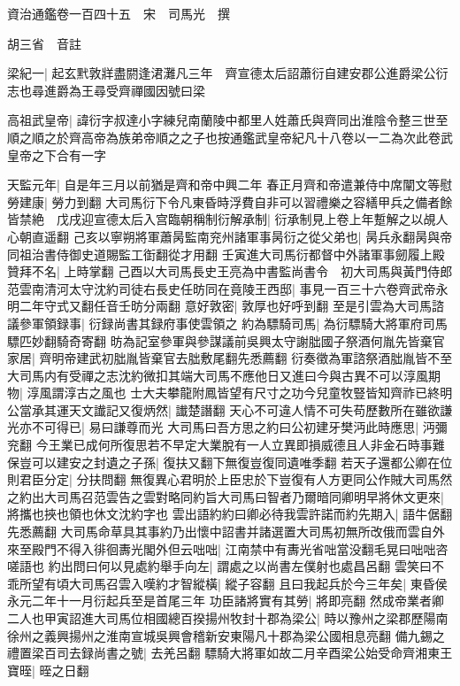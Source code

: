 資治通鑑卷一百四十五　宋　司馬光　撰

胡三省　音註

梁紀一|{
	起玄黓敦牂盡閼逢涒灘凡三年　齊宣德太后詔蕭衍自建安郡公進爵梁公衍志也尋進爵為王尋受齊禪國因號曰梁}


高祖武皇帝|{
	諱衍字叔達小字練兒南蘭陵中都里人姓蕭氏與齊同出淮陰令整三世至順之順之於齊高帝為族弟帝順之之子也按通鑑武皇帝紀凡十八卷以一二為次此卷武皇帝之下合有一字}


天監元年|{
	自是年三月以前猶是齊和帝中興二年}
春正月齊和帝遣兼侍中席闡文等慰勞建康|{
	勞力到翻}
大司馬衍下令凡東昏時浮費自非可以習禮樂之容繕甲兵之備者餘皆禁絶　戊戌迎宣德太后入宫臨朝稱制衍解承制|{
	衍承制見上卷上年蹔解之以覘人心朝直遥翻}
己亥以寧朔將軍蕭昺監南兖州諸軍事昺衍之從父弟也|{
	昺兵永翻昺與帝同祖治書侍御史道賜監工衘翻從才用翻}
壬寅進大司馬衍都督中外諸軍事劒履上殿贊拜不名|{
	上時掌翻}
己酉以大司馬長史王亮為中書監尚書令　初大司馬與黃門侍郎范雲南清河太守沈約司徒右長史任昉同在竟陵王西邸|{
	事見一百三十六卷齊武帝永明二年守式又翻任音壬昉分兩翻}
意好敦密|{
	敦厚也好呼到翻}
至是引雲為大司馬諮議參軍領録事|{
	衍録尚書其録府事使雲領之}
約為驃騎司馬|{
	為衍驃騎大將軍府司馬驃匹妙翻騎奇寄翻}
昉為記室參軍與參謀議前吳興太守謝朏國子祭酒何胤先皆棄官家居|{
	齊明帝建武初朏胤皆棄官去朏敷尾翻先悉薦翻}
衍奏徵為軍諮祭酒朏胤皆不至大司馬内有受禪之志沈約微扣其端大司馬不應他日又進曰今與古異不可以淳風期物|{
	淳風謂淳古之風也}
士大夫攀龍附鳳皆望有尺寸之功今兒童牧豎皆知齊祚已終明公當承其運天文䜟記又復炳然|{
	䜟楚譖翻}
天心不可違人情不可失苟歷數所在雖欲謙光亦不可得已|{
	易曰謙尊而光}
大司馬曰吾方思之約曰公初建牙樊沔此時應思|{
	沔彌兖翻}
今王業已成何所復思若不早定大業脫有一人立異即損威德且人非金石時事難保豈可以建安之封遺之子孫|{
	復扶又翻下無復豈復同遺唯季翻}
若天子還都公卿在位則君臣分定|{
	分扶問翻}
無復異心君明於上臣忠於下豈復有人方更同公作賊大司馬然之約出大司馬召范雲告之雲對略同約旨大司馬曰智者乃爾暗同卿明早將休文更來|{
	將攜也挾也領也休文沈約字也}
雲出語約約曰卿必待我雲許諾而約先期入|{
	語牛倨翻先悉薦翻}
大司馬命草具其事約乃出懷中詔書并諸選置大司馬初無所改俄而雲自外來至殿門不得入徘徊夀光閣外但云咄咄|{
	江南禁中有夀光省咄當没翻毛晃曰咄咄咨嗟語也}
約出問曰何以見處約舉手向左|{
	謂處之以尚書左僕射也處昌呂翻}
雲笑曰不乖所望有頃大司馬召雲入嘆約才智縱橫|{
	縱子容翻}
且曰我起兵於今三年矣|{
	東昏侯永元二年十一月衍起兵至是首尾三年}
功臣諸將實有其勞|{
	將即亮翻}
然成帝業者卿二人也甲寅詔進大司馬位相國總百揆揚州牧封十郡為梁公|{
	時以豫州之梁郡歷陽南徐州之義興揚州之淮南宣城吳興會稽新安東陽凡十郡為梁公國相息亮翻}
備九錫之禮置梁百司去録尚書之號|{
	去羌呂翻}
驃騎大將軍如故二月辛酉梁公始受命齊湘東王寶晊|{
	晊之日翻}
